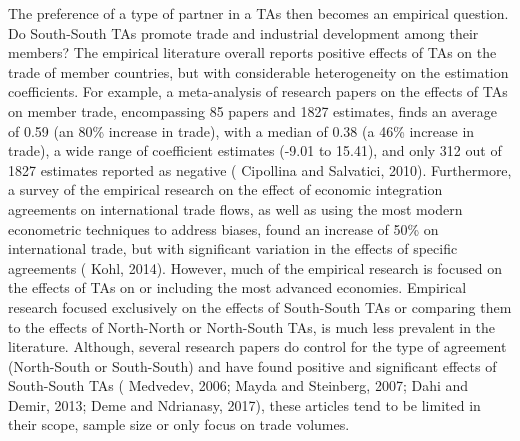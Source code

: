 The preference of a type of partner in a TAs then becomes an empirical
question. Do South-South TAs promote trade and industrial development
among their members? The empirical literature overall reports positive
effects of TAs on the trade of member countries, but with considerable
heterogeneity on the estimation coefficients. For example, a
meta-analysis of research papers on the effects of TAs on member trade,
encompassing 85 papers and 1827 estimates, finds an average of 0.59 (an
80\% increase in trade), with a median of 0.38 (a 46\% increase in
trade), a wide range of coefficient estimates (-9.01 to 15.41), and only
312 out of 1827 estimates reported as negative (\cite{cipollina_reciprocal_2010} Cipollina and Salvatici,
2010). Furthermore, a survey of the empirical research on the effect of
economic integration agreements on international trade flows, as well as
using the most modern econometric techniques to address biases, found an
increase of 50\% on international trade, but with significant variation
in the effects of specific agreements (\cite{kohl_we_2014} Kohl, 2014). However, much of the
empirical research is focused on the effects of TAs on or including the
most advanced economies. Empirical research focused exclusively on the
effects of South-South TAs or comparing them to the effects of
North-North or North-South TAs, is much less prevalent in the
literature. Although, several research papers do control for the type of
agreement (North-South or South-South) and have found positive and
significant effects of South-South TAs (\cite{medvedev_preferential_2006} Medvedev, 2006; \cite{mayda_south-south_2007} Mayda and
Steinberg, 2007; \cite{dahi_preferential_2013} Dahi and Demir, 2013; \cite{deme_trade-creation_2017} Deme and Ndrianasy, 2017), these
articles tend to be limited in their scope, sample size or only focus on
trade volumes.


